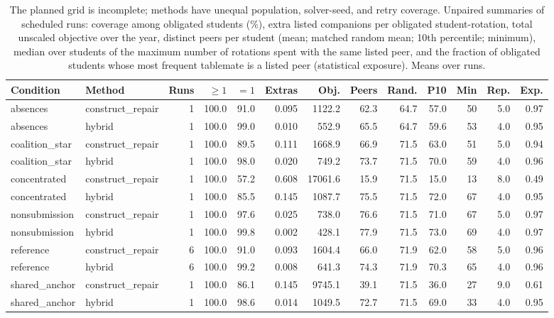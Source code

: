 \begin{table}[tb]\centering\scriptsize\setlength{\tabcolsep}{4pt}
\caption{The planned grid is incomplete; methods have unequal population, solver-seed, and retry coverage. Unpaired summaries of scheduled runs: coverage among obligated students (\%), extra listed companions per obligated student-rotation, total unscaled objective over the year, distinct peers per student (mean; matched random mean; 10th percentile; minimum), median over students of the maximum number of rotations spent with the same listed peer, and the fraction of obligated students whose most frequent tablemate is a listed peer (statistical exposure). Means over runs.}\label{tab:evalQuality}
\begin{tabular}{@{}llrrrrrrrrrrr@{}}\toprule
Condition & Method & Runs & $\ge1$ & $=1$ & Extras & Obj. & Peers & Rand. & P10 & Min & Rep. & Exp. \\ \midrule
absences & construct\_repair & 1 & 100.0 & 91.0 & 0.095 & 1122.2 & 62.3 & 64.7 & 57.0 & 50 & 5.0 & 0.97 \\
absences & hybrid & 1 & 100.0 & 99.0 & 0.010 & 552.9 & 65.5 & 64.7 & 59.6 & 53 & 4.0 & 0.95 \\
coalition\_star & construct\_repair & 1 & 100.0 & 89.5 & 0.111 & 1668.9 & 66.9 & 71.5 & 63.0 & 51 & 5.0 & 0.94 \\
coalition\_star & hybrid & 1 & 100.0 & 98.0 & 0.020 & 749.2 & 73.7 & 71.5 & 70.0 & 59 & 4.0 & 0.96 \\
concentrated & construct\_repair & 1 & 100.0 & 57.2 & 0.608 & 17061.6 & 15.9 & 71.5 & 15.0 & 13 & 8.0 & 0.49 \\
concentrated & hybrid & 1 & 100.0 & 85.5 & 0.145 & 1087.7 & 75.5 & 71.5 & 72.0 & 67 & 4.0 & 0.95 \\
nonsubmission & construct\_repair & 1 & 100.0 & 97.6 & 0.025 & 738.0 & 76.6 & 71.5 & 71.0 & 67 & 5.0 & 0.97 \\
nonsubmission & hybrid & 1 & 100.0 & 99.8 & 0.002 & 428.1 & 77.9 & 71.5 & 73.0 & 69 & 4.0 & 0.97 \\
reference & construct\_repair & 6 & 100.0 & 91.0 & 0.093 & 1604.4 & 66.0 & 71.9 & 62.0 & 58 & 5.0 & 0.96 \\
reference & hybrid & 6 & 100.0 & 99.2 & 0.008 & 641.3 & 74.3 & 71.9 & 70.3 & 65 & 4.0 & 0.96 \\
shared\_anchor & construct\_repair & 1 & 100.0 & 86.1 & 0.145 & 9745.1 & 39.1 & 71.5 & 36.0 & 27 & 9.0 & 0.61 \\
shared\_anchor & hybrid & 1 & 100.0 & 98.6 & 0.014 & 1049.5 & 72.7 & 71.5 & 69.0 & 33 & 4.0 & 0.95 \\

\end{tabular}
\end{table}
